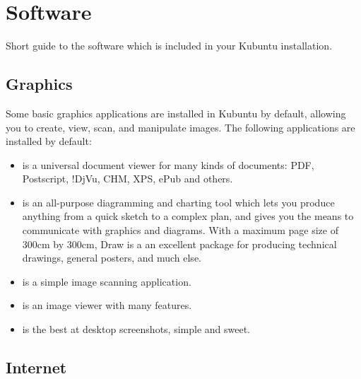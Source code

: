 \documentclass[letterpaper,10pt,english]{sphinxmanual}
\begin{document}


\chapter{Software}
\label{\detokenize{docs/software:software}}\label{\detokenize{docs/software:software-link}}\label{\detokenize{docs/software::doc}}
Short guide to the software which is included in your Kubuntu installation.


\section{Graphics}
\label{\detokenize{docs/software:graphics}}
Some basic graphics applications are installed in Kubuntu by default, allowing you to create, view, scan, and manipulate images. The following applications are installed by default:
\begin{itemize}
\item {} 
 is a universal document viewer for many kinds of documents: PDF, Postscript, !DjVu, CHM, XPS, ePub and others.

\item {} 
 is an all-purpose diagramming and charting tool which lets you produce anything from a quick sketch to a complex plan, and gives you the means to communicate with graphics and diagrams. With a maximum page size of 300cm by 300cm, Draw is a an excellent package for producing technical drawings, general posters, and much else.

\item {} 
 is a simple image scanning application.

\item {} 
 is an image viewer with many features.

\item {} 
 is the best at desktop screenshots, simple and sweet.

\end{itemize}


\section{Internet}
\label{\detokenize{docs/software:internet}}
\end{document}
